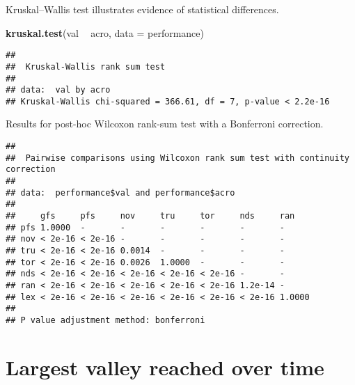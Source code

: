 \documentclass[]{book}
\newenvironment{Shaded}{\begin{snugshade}}{\end{snugshade}}
\newcommand{\DataTypeTok}[1]{\textcolor[rgb]{0.13,0.29,0.53}{#1}}
\newcommand{\KeywordTok}[1]{\textcolor[rgb]{0.13,0.29,0.53}{\textbf{#1}}}
\newcommand{\NormalTok}[1]{#1}
\newcommand{\OperatorTok}[1]{\textcolor[rgb]{0.81,0.36,0.00}{\textbf{#1}}}
\newcommand{\OtherTok}[1]{\textcolor[rgb]{0.56,0.35,0.01}{#1}}
\newcommand{\StringTok}[1]{\textcolor[rgb]{0.31,0.60,0.02}{#1}}
\begin{document}
Kruskal--Wallis test illustrates evidence of statistical differences.

\begin{Shaded}
\begin{Highlighting}[]
\KeywordTok{kruskal.test}\NormalTok{(val }\OperatorTok{~}\StringTok{ }\NormalTok{acro, }\DataTypeTok{data =}\NormalTok{ performance)}
\end{Highlighting}
\end{Shaded}

\begin{verbatim}
## 
##  Kruskal-Wallis rank sum test
## 
## data:  val by acro
## Kruskal-Wallis chi-squared = 366.61, df = 7, p-value < 2.2e-16
\end{verbatim}

Results for post-hoc Wilcoxon rank-sum test with a Bonferroni correction.

\begin{Shaded}
\end{Shaded}

\begin{verbatim}
## 
##  Pairwise comparisons using Wilcoxon rank sum test with continuity correction 
## 
## data:  performance$val and performance$acro 
## 
##     gfs     pfs     nov     tru     tor     nds     ran   
## pfs 1.0000  -       -       -       -       -       -     
## nov < 2e-16 < 2e-16 -       -       -       -       -     
## tru < 2e-16 < 2e-16 0.0014  -       -       -       -     
## tor < 2e-16 < 2e-16 0.0026  1.0000  -       -       -     
## nds < 2e-16 < 2e-16 < 2e-16 < 2e-16 < 2e-16 -       -     
## ran < 2e-16 < 2e-16 < 2e-16 < 2e-16 < 2e-16 1.2e-14 -     
## lex < 2e-16 < 2e-16 < 2e-16 < 2e-16 < 2e-16 < 2e-16 1.0000
## 
## P value adjustment method: bonferroni
\end{verbatim}

\hypertarget{largest-valley-reached-over-time}{%
\section{Largest valley reached over time}\label{largest-valley-reached-over-time}}
\end{document}
